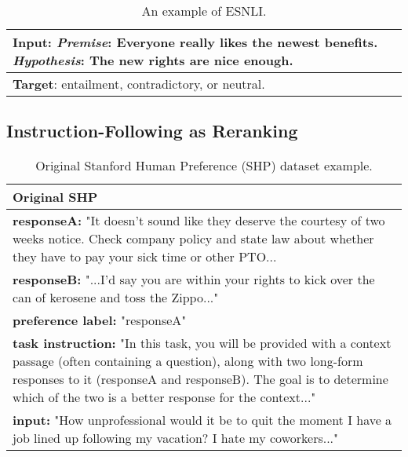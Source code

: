 \begin{table*}[h]
\centering
\small
\begin{tabular}{p{15.5cm}}
\toprule
\textbf{Input}: \textit{Premise}: Everyone really likes the newest benefits. \textit{Hypothesis}: The new rights are nice enough. \\ 
\midrule
\textbf{Target}: entailment, contradictory, or neutral. \\ 
\bottomrule
\end{tabular}
\caption{An example of ESNLI.}
\label{tab:esnli-reranking-example}
\end{table*}





\subsection{Instruction-Following as Reranking}


\begin{table*}[htbp]
\centering
\small

\begin{tabular}{p{15.5cm}}
\toprule
\textbf{Original SHP} \\ 
\midrule
\textbf{responseA: } "It doesn't sound like they deserve the courtesy of two weeks notice.   Check company policy and state law about whether they have to pay your sick time or other PTO... \\
\midrule
\textbf{responseB: } "...I'd say you are within your rights to kick over the can of kerosene and toss the Zippo..." \\
\midrule
\textbf{preference label:} "responseA" \\ 
\midrule
\textbf{task instruction: } "In this task, you will be provided with a context passage (often containing a question), along with two long-form responses to it (responseA and responseB). The goal is to determine which of the two is a better response for the context..." \\ 
\textbf{input: } "How unprofessional would it be to quit the moment I have a job lined up following my vacation? I hate my coworkers..." \\ 
\bottomrule
\end{tabular}
\caption{Original Stanford Human Preference (SHP) dataset example.}
\label{tab:original-shp-example}
\end{table*}


